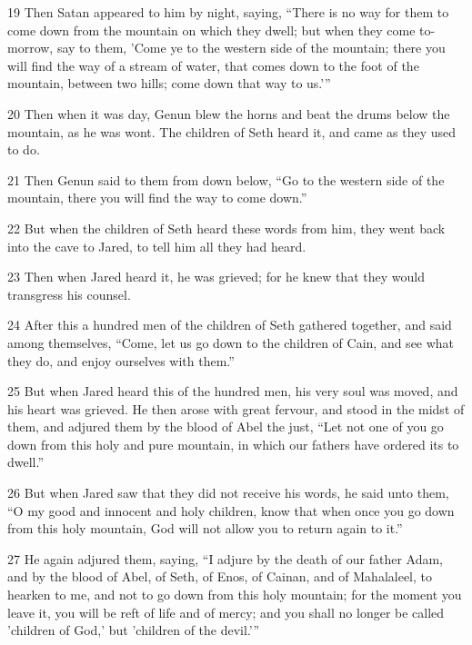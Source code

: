 \par 19 Then Satan appeared to him by night, saying, “There is no way for them to come down from the mountain on which they dwell; but when they come to-morrow, say to them, 'Come ye to the western side of the mountain; there you will find the way of a stream of water, that comes down to the foot of the mountain, between two hills; come down that way to us.'”

\par 20 Then when it was day, Genun blew the horns and beat the drums below the mountain, as he was wont. The children of Seth heard it, and came as they used to do.

\par 21 Then Genun said to them from down below, “Go to the western side of the mountain, there you will find the way to come down.”

\par 22 But when the children of Seth heard these words from him, they went back into the cave to Jared, to tell him all they had heard.

\par 23 Then when Jared heard it, he was grieved; for he knew that they would transgress his counsel.

\par 24 After this a hundred men of the children of Seth gathered together, and said among themselves, “Come, let us go down to the children of Cain, and see what they do, and enjoy ourselves with them.”

\par 25 But when Jared heard this of the hundred men, his very soul was moved, and his heart was grieved. He then arose with great fervour, and stood in the midst of them, and adjured them by the blood of Abel the just, “Let not one of you go down from this holy and pure mountain, in which our fathers have ordered its to dwell.”

\par 26 But when Jared saw that they did not receive his words, he said unto them, “O my good and innocent and holy children, know that when once you go down from this holy mountain, God will not allow you to return again to it.”

\par 27 He again adjured them, saying, “I adjure by the death of our father Adam, and by the blood of Abel, of Seth, of Enos, of Cainan, and of Mahalaleel, to hearken to me, and not to go down from this holy mountain; for the moment you leave it, you will be reft of life and of mercy; and you shall no longer be called 'children of God,' but 'children of the devil.'”

